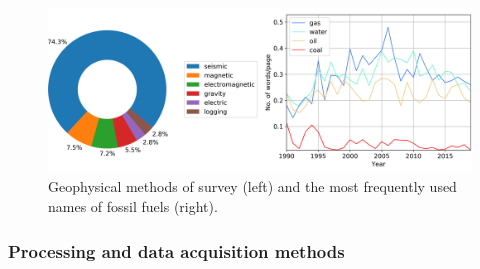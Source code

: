 \documentclass[geosciences,article,submit,moreauthors,pdftex]{Definitions/mdpi}
\begin{document}
\begin{figure}[ht!]
\centering
\includegraphics[width=\textwidth]{methods_pie_objects.png}
\caption{Geophysical methods of survey (left) and the most frequently used names of fossil fuels (right).}
\label{methods_objects}
\end{figure}

\subsubsection{Processing and data acquisition methods} 
\end{document}
